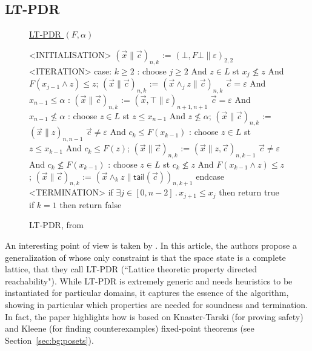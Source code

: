 \subsection{LT-PDR}\label{sec:sota:lt-pdr}
\begin{figure}[t]
	\begin{center}
		\underline{{LT-PDR} $(F,\alpha)$}
		{\small
			\begin{codeNT}
<INITIALISATION>
  $( \vec{x} \| \vec{c} )_{n,k}$ := $(\bot, F \bot \| \varepsilon)_{2,2}$
<ITERATION>						            %
  case:
       $k \ge 2$ :               	         	%
			choose $j \ge 2$ And $z \in L$ st $x_{j} \nleq z$ And $F(x_{j-1} \land z) \leq z$;
			$(\vec{x} \| \vec{c} )_{n,k}$ := $(\vec{x} \land_j z \| \vec{c} )_{n,k}$
       $\vec{c}=\varepsilon$ And $x_{n-1} \leq \alpha$     :                    %
			$( \vec{x} \| \vec{c} )_{n,k}$ := $( \vec{x}, \top \| \varepsilon )_{n+1,n+1}$
       $\vec{c}=\varepsilon$ And $x_{n-1} \nleq \alpha$    :                     %
			choose $z \in L$ st $z \le x_{n-1}$ And $z \nleq \alpha$;
			$( \vec{x} \| \vec{c} )_{n,k}$ := $( \vec{x} \| z )_{n,n-1}$
       $\vec{c} \neq \varepsilon$ And $c_k \le F(x_{k-1})$ :                        %
			choose $z \in L$ st $z \le x_{k-1}$ And $c_{k} \le F(z)$;
			$( \vec{x} \| \vec{c} )_{n,k}$ := $(\vec{x} \| z , \vec{c} )_{n,k-1}$
       $\vec{c} \neq \varepsilon$ And $c_{k} \nleq F(x_{k-1})$ :                        %
			choose $z \in L$ st $c_k \nleq z$ And $F(x_{k-1} \land z) \le z$;
			$( \vec{x} \| \vec{c} )_{n,k}$ := $(\vec{x} \land_k z \| \mathsf{tail}(\vec{c}) )_{n,k+1}$
  endcase
<TERMINATION>
  if $\exists j\in [0,n-2]\,.\, x_{j+1} \leq x_j$ then return true		 %
  if $k = 1$ then return false						 %
\end{codeNT}
		}
	\end{center}
	\caption{LT-PDR, from~\cite{KUKSH22}}\label{fig:sota:lt-pdr}
\end{figure}
An interesting point of view is taken by \cite{KUKSH22}. In this article, the authors propose a generalization of  whose only constraint is that the space state is a complete lattice, that they call LT-PDR (``Lattice theoretic property directed reachability"). While LT-PDR is extremely generic and needs heuristics to be instantiated for particular domains, it captures the essence of the algorithm, showing in particular which properties are needed for soundness and termination. In fact, the paper highlights how  is based on Knaster-Tarski (for proving safety) and Kleene (for finding counterexamples) fixed-point theorems (see Section~\ref{sec:bg:posets}).
